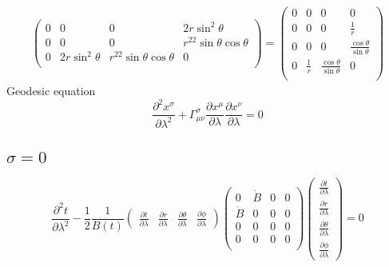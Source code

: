 \begin{subequations}
\begin{align}
\begin{pmatrix}
            0 & 0              & 0                        & 2r\sin^2\theta           \\
            0 & 0              & 0                        & r^22\sin\theta\cos\theta \\
            0 & 2r\sin^2\theta & r^22\sin\theta\cos\theta & 0                        \\
        \end{pmatrix} =
        \begin{pmatrix}
            0 & 0           & 0                             & 0                             \\
            0 & 0           & 0                             & \frac{1}{r}                   \\
            0 & 0           & 0                             & \frac{\cos\theta}{\sin\theta} \\
            0 & \frac{1}{r} & \frac{\cos\theta}{\sin\theta} & 0                             \\
        \end{pmatrix}
    \end{align}
\end{subequations}
%
Geodesic equation
%
\begin{equation}
    \frac{\partial^2 x^\sigma}{\partial \lambda^2} +
    \Gamma^\sigma_{\mu\nu}\frac{\partial x^\mu}{\partial \lambda}\frac{\partial x^\nu}{\partial \lambda} = 0
\end{equation}
%
\subsection*{$\sigma = 0$}

\begin{equation}
    \frac{\partial^2 t}{\partial \lambda^2} -
    \frac{1}{2} \frac{1}{B(t)}
    \begin{pmatrix}
        \frac{\partial t}{\partial \lambda}      &
        \frac{\partial r}{\partial \lambda}      &
        \frac{\partial \theta}{\partial \lambda} &
        \frac{\partial \phi}{\partial \lambda}
    \end{pmatrix}
    \begin{pmatrix}
        0       & \dot{B} & 0 & 0 \\
        \dot{B} & 0       & 0 & 0 \\
        0       & 0       & 0 & 0 \\
        0       & 0       & 0 & 0 \\
    \end{pmatrix}
    \begin{pmatrix}
        \frac{\partial t}{\partial \lambda}      \\[6pt]
        \frac{\partial r}{\partial \lambda}      \\[6pt]
        \frac{\partial \theta}{\partial \lambda} \\[6pt]
        \frac{\partial \phi}{\partial \lambda}
    \end{pmatrix} = 0
\end{equation}

